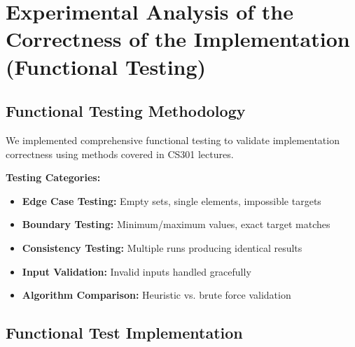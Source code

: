 \documentclass[12pt,a4paper]{article}
\begin{document}
\section{Experimental Analysis of the Correctness of the Implementation (Functional Testing)}

\subsection{Functional Testing Methodology}

We implemented comprehensive functional testing to validate implementation correctness using methods covered in CS301 lectures.

\textbf{Testing Categories:}
\begin{itemize}
\item \textbf{Edge Case Testing:} Empty sets, single elements, impossible targets
\item \textbf{Boundary Testing:} Minimum/maximum values, exact target matches
\item \textbf{Consistency Testing:} Multiple runs producing identical results
\item \textbf{Input Validation:} Invalid inputs handled gracefully
\item \textbf{Algorithm Comparison:} Heuristic vs. brute force validation
\end{itemize}

\subsection{Functional Test Implementation}
\end{document}
